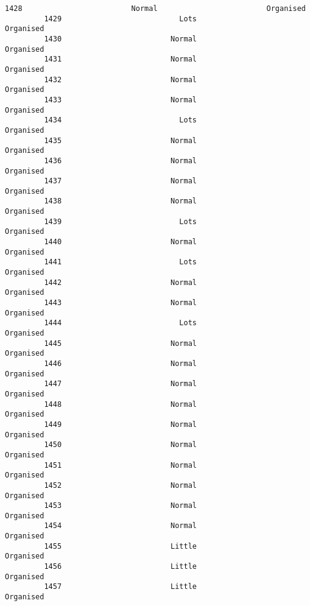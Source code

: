\documentclass[11pt]{article}
\begin{document}
\begin{Verbatim}[commandchars=\\\{\}]
         1428                         Normal                         Organised   
         1429                           Lots                         Organised   
         1430                         Normal                         Organised   
         1431                         Normal                         Organised   
         1432                         Normal                         Organised   
         1433                         Normal                         Organised   
         1434                           Lots                         Organised   
         1435                         Normal                         Organised   
         1436                         Normal                         Organised   
         1437                         Normal                         Organised   
         1438                         Normal                         Organised   
         1439                           Lots                         Organised   
         1440                         Normal                         Organised   
         1441                           Lots                         Organised   
         1442                         Normal                         Organised   
         1443                         Normal                         Organised   
         1444                           Lots                         Organised   
         1445                         Normal                         Organised   
         1446                         Normal                         Organised   
         1447                         Normal                         Organised   
         1448                         Normal                         Organised   
         1449                         Normal                         Organised   
         1450                         Normal                         Organised   
         1451                         Normal                         Organised   
         1452                         Normal                         Organised   
         1453                         Normal                         Organised   
         1454                         Normal                         Organised   
         1455                         Little                         Organised   
         1456                         Little                         Organised   
         1457                         Little                         Organised   
         

\end{Verbatim}
\end{document}
